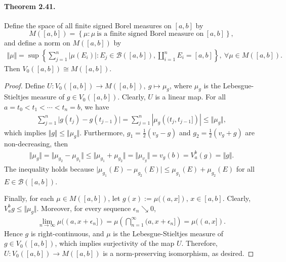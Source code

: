 \documentclass{article}
\begin{document}
\paragraph{Theorem 2.41.\label{thm:2.41}} Define the space of all finite signed Borel measures on $[a,b]$ by
$$M([a,b]) = \left\{\mu:\mu\ \text{is a finite signed Borel measure on}\ [a,b]\right\},$$ 
and define a norm on $M([a,b])$ by
\begin{align*}
	\Vert\mu\Vert = \sup\left\{\sum_{j=1}^n\left\vert\mu(E_i)\right\vert:E_j\in\mathscr{B}([a,b]),\coprod_{i=1}^n E_i=[a,b]\right\},\ \forall \mu\in M([a,b]).
\end{align*}
Then $V_0([a,b])\cong M([a,b])$.
\begin{proof}
Define $U:V_0([a,b])\to M([a,b]),\ g\mapsto \mu_g$, where $\mu_g$ is the Lebesgue-Stieltjes measure of $g\in V_0([a,b])$. Clearly, $U$ is a linear map. For all $a=t_0<t_1<\cdots < t_n = b$, we have
\begin{align*}
	\sum_{j=1}^n\vert g(t_{j})-g(t_{j-1})\vert = \sum_{j=1}^n\left\vert \mu_g\left((t_{j},t_{j-1}]\right)\right\vert\leq\Vert \mu_g\Vert,
\end{align*}
which implies $\Vert g\Vert \leq \Vert\mu_g\Vert$. Furthermore, $g_1=\frac{1}{2}(v_g-g)$ and $g_2=\frac{1}{2}(v_g+g)$ are non-decreasing, then
\begin{align*}
	\Vert \mu_g\Vert = \Vert \mu_{g_2}-\mu_{g_1}\Vert \leq \Vert \mu_{g_1} + \mu_{g_2}\Vert = \Vert \mu_{v_g}\Vert = v_g(b) = V_a^b(g) = \Vert g\Vert.
\end{align*}
The inequality holds because $\vert \mu_{g_1}(E)-\mu_{g_2}(E)\vert \leq \mu_{g_1}(E)+\mu_{g_2}(E)$ for all $E\in\mathscr{B}([a,b])$.
\vspace{0.1cm}

Finally, for each $\mu\in M([a,b])$, let $g(x):=\mu((a,x]),\, x\in[a,b]$. Clearly, $V_a^b g\leq\Vert\mu_g\Vert$. Moreover, for every sequence $\epsilon_n\searrow 0$,
\begin{align*}
	\lim_{n\to \infty}\mu((a,x+\epsilon_n]) = \mu\left(\bigcap_{n=1}^\infty(a,x+\epsilon_n]\right) = \mu((a,x]).
\end{align*}
Hence $g$ is right-continuous, and $\mu$ is the Lebesgue-Stieltjes measure of $g\in V_0([a,b])$, which implies surjectivity of the map $U$. Therefore, $U:V_0([a,b])\to M([a,b])$ is a norm-preserving isomorphism, as desired.
\end{proof}
\end{document}

